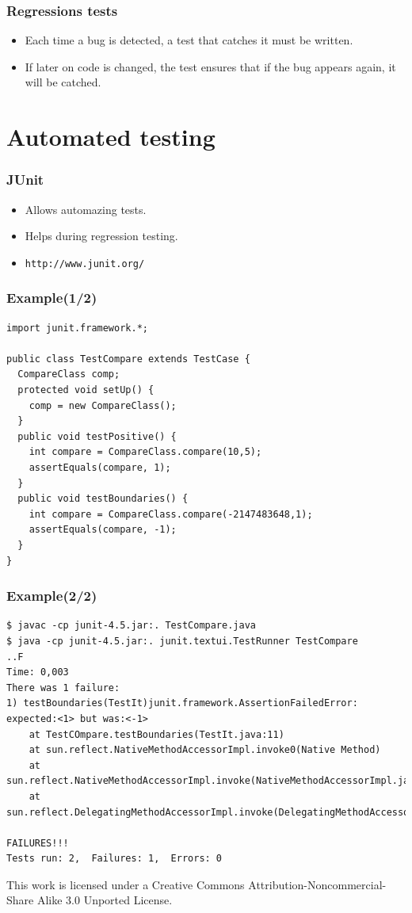 \documentclass[10pt]{beamer}
\begin{document}
\begin{frame}[fragile]
  \frametitle{Regressions tests}
  \begin{itemize}
    \item Each time a bug is detected, a test that catches it must be written.
    \item If later on code is changed, the test ensures that if the bug appears
      again, it will be catched.
  \end{itemize}
\end{frame}

\section{Automated testing}
\begin{frame}[fragile]
  \frametitle{JUnit}
  \begin{itemize}
    \item Allows automazing tests.
    \item Helps during regression testing.
    \item \verb!http://www.junit.org/!
  \end{itemize}
\end{frame}

\begin{frame}[fragile]
  \frametitle{Example(1/2)}
\begin{verbatim}
import junit.framework.*;

public class TestCompare extends TestCase {
  CompareClass comp;
  protected void setUp() {
    comp = new CompareClass();
  }
  public void testPositive() {
    int compare = CompareClass.compare(10,5);
    assertEquals(compare, 1);
  }
  public void testBoundaries() {
    int compare = CompareClass.compare(-2147483648,1);
    assertEquals(compare, -1);
  }
}
\end{verbatim}
\end{frame}

\begin{frame}
  \frametitle{Example(2/2)}
\tiny
\begin{verbatim}
$ javac -cp junit-4.5.jar:. TestCompare.java
$ java -cp junit-4.5.jar:. junit.textui.TestRunner TestCompare
..F
Time: 0,003
There was 1 failure:
1) testBoundaries(TestIt)junit.framework.AssertionFailedError: expected:<1> but was:<-1>
	at TestCOmpare.testBoundaries(TestIt.java:11)
	at sun.reflect.NativeMethodAccessorImpl.invoke0(Native Method)
	at sun.reflect.NativeMethodAccessorImpl.invoke(NativeMethodAccessorImpl.java:39)
	at sun.reflect.DelegatingMethodAccessorImpl.invoke(DelegatingMethodAccessorImpl.java:25)

FAILURES!!!
Tests run: 2,  Failures: 1,  Errors: 0
\end{verbatim}
\end{frame}

\begin{frame}[fragile]

    \tiny

  \begin{center}
        This work is licensed under a Creative Commons Attribution-Noncommercial-Share Alike 3.0 Unported License.
  \end{center}
\end{frame}
\end{document}
